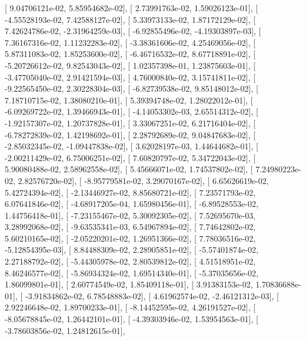 \documentclass{article}
\begin{document}
       [  9.04706121e-02,   5.85954682e-02],
       [  2.73991763e-02,   1.59026123e-01],
       [ -4.55528193e-02,   7.42588127e-02],
       [  5.33973133e-02,   1.87172129e-02],
       [  7.42624786e-02,  -2.31964259e-03],
       [ -6.92855496e-02,  -4.19303897e-03],
       [  7.36167316e-02,   1.11232283e-02],
       [ -3.38361606e-02,   4.25469056e-02],
       [  5.87311083e-02,   1.85253600e-02],
       [ -6.46716532e-02,   8.67718891e-02],
       [ -5.20726612e-02,   9.82543043e-02],
       [  1.02357398e-01,   1.23875603e-01],
       [ -3.47705040e-02,   2.91421594e-03],
       [  4.76000840e-02,   3.15741811e-02],
       [ -9.22565450e-02,   2.30228304e-03],
       [ -6.82739538e-02,   9.85148012e-02],
       [  7.18710715e-02,   1.38080210e-01],
       [  5.39394748e-02,   1.28022012e-01],
       [ -6.09269722e-02,   1.39466943e-01],
       [ -4.14053302e-03,   2.65514312e-02],
       [ -1.92157307e-02,   1.20737828e-01],
       [  3.33067251e-02,   6.21716404e-02],
       [ -6.78272839e-02,   1.42198692e-01],
       [  2.28792689e-02,   9.04847683e-02],
       [ -2.85032345e-02,  -1.09447838e-02],
       [  3.62028197e-03,   1.44644682e-01],
       [ -2.00211429e-02,   6.75006251e-02],
       [  7.60820797e-02,   5.34722043e-02],
       [  5.90080488e-02,   2.58962558e-02],
       [  5.45666071e-02,   1.74537802e-02],
       [  7.24980223e-02,   2.82576720e-02],
       [ -8.95779581e-02,   3.29070167e-02],
       [  6.65626619e-02,   5.42724394e-02],
       [ -2.13446927e-02,   8.85680721e-02],
       [  7.23571793e-02,   6.07641846e-02],
       [ -4.68917205e-04,   1.65980456e-01],
       [ -6.89528553e-02,   1.44756418e-01],
       [ -7.23155467e-02,   5.30092305e-02],
       [  7.52695670e-03,   3.28992068e-02],
       [ -9.63535341e-03,   6.54967894e-02],
       [  7.74642802e-02,   5.60210165e-02],
       [ -2.05220201e-02,   1.26951366e-02],
       [  7.78036516e-02,  -5.12854395e-03],
       [  8.84488309e-02,   2.28905851e-02],
       [ -5.57401874e-02,   2.27188792e-02],
       [ -5.44305978e-02,   2.80539812e-02],
       [  4.51518951e-02,   8.46246577e-02],
       [ -5.86934324e-02,   1.69514340e-01],
       [ -5.37035656e-02,   1.86099801e-01],
       [  2.60774549e-02,   1.85409118e-01],
       [  3.91383153e-02,   1.70836688e-01],
       [ -3.91834862e-02,   6.78548883e-02],
       [  4.61962574e-02,  -2.46121312e-03],
       [  2.92246648e-02,   1.89700233e-01],
       [ -8.14452595e-02,   4.26191527e-02],
       [ -8.05678845e-02,   1.26442101e-01],
       [ -4.39303946e-02,   1.53954563e-01],
       [ -3.78603856e-02,   1.24812615e-01],
\end{document}
